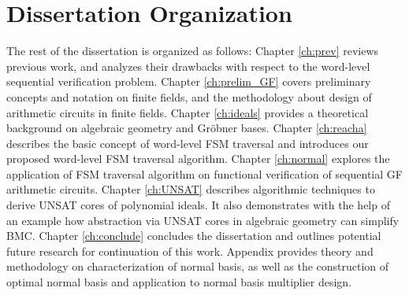 \section{Dissertation Organization}
The rest of the dissertation is organized as
follows: Chapter \ref{ch:prev} reviews previous work, and analyzes their drawbacks with respect to 
the word-level sequential verification problem.
Chapter \ref{ch:prelim_GF} covers preliminary
concepts and notation on finite fields, and the methodology about design of arithmetic circuits in finite fields.
Chapter \ref{ch:ideals} provides a theoretical background on algebraic geometry and Gr\"obner bases.
Chapter \ref{ch:reacha} describes the basic
concept of word-level FSM traversal and introduces our proposed word-level FSM traversal algorithm. 
Chapter \ref{ch:normal} explores the application of FSM traversal algorithm on 
functional verification of sequential GF arithmetic circuits. Chapter \ref{ch:UNSAT} describes
algorithmic techniques to derive UNSAT cores of polynomial
ideals. It also demonstrates with the help of an example how abstraction via
UNSAT cores in algebraic geometry can simplify BMC. 
Chapter \ref{ch:conclude} concludes the dissertation and outlines potential future research for
continuation of this work. Appendix provides theory and methodology on characterization of normal basis,
as well as the construction of optimal normal basis and application to normal basis multiplier design.